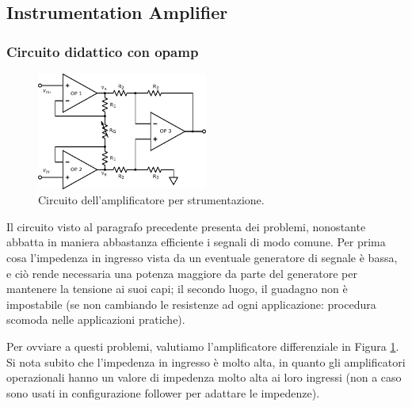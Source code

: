 \newpage
\subsection{Instrumentation Amplifier}

\subsubsection*{Circuito didattico con opamp}

\begin{figure}
  \begin{center}
    \includegraphics[width=0.5\textwidth]{../E05/latex/c_INA.pdf}
  \end{center}
  \caption{Circuito dell'amplificatore per strumentazione.}
  \label{cir5:instr_amplif}
\end{figure}

Il circuito visto al paragrafo precedente presenta dei problemi, nonostante abbatta in maniera abbastanza efficiente i segnali di modo comune. Per prima cosa l'impedenza in ingresso vista da un eventuale generatore di segnale è bassa, e ciò rende necessaria una potenza maggiore da parte del generatore per mantenere la tensione ai suoi capi; il secondo luogo, il guadagno non è impostabile (se non cambiando le resistenze ad ogni applicazione: procedura scomoda nelle applicazioni pratiche).

Per ovviare a questi problemi, valutiamo l'amplificatore differenziale in Figura \ref{cir5:instr_amplif}. Si nota subito che l'impedenza in ingresso è molto alta, in quanto gli amplificatori operazionali hanno un valore di impedenza molto alta ai loro ingressi (non a caso sono usati in configurazione follower per adattare le impedenze).

